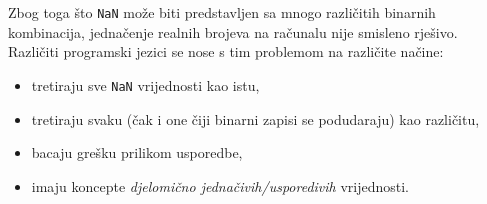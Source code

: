 Zbog toga što \verb|NaN| može biti predstavljen sa mnogo različitih binarnih kombinacija, jednačenje realnih brojeva na računalu nije smisleno rješivo. Različiti programski jezici se nose s tim problemom na različite načine:

\begin{itemize}
    \item tretiraju sve \verb|NaN| vrijednosti kao istu,
    \item tretiraju svaku (čak i one čiji binarni zapisi se podudaraju) kao različitu,
    \item bacaju grešku prilikom usporedbe,
    \item imaju koncepte \textit{djelomično jednačivih/usporedivih} vrijednosti.
\end{itemize}
